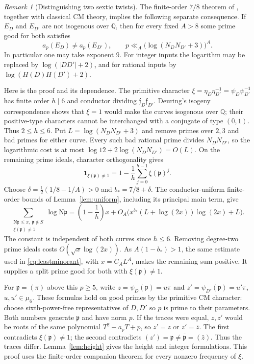 \documentclass[11pt,a4paper]{article}
\numberwithin{equation}{section}
\theoremstyle{definition}
\theoremstyle{remark}
\newtheorem{remark}[theorem]{Remark}
\newcommand{\Q}{\mathbb Q}
\newcommand{\N}{\mathrm N}
\newcommand{\ind}{\mathbf 1}
\begin{document}
\begin{remark}[Distinguishing two sextic twists]\label{rem:distinguish}
The finite-order $7/8$ theorem of \cite[Theorem 1.1]{QRH78}, together with classical CM theory, implies the following separate consequence. If $E_D$ and $E_{D'}$ are not isogenous over $\Q$, then for every fixed $A>8$ some prime good for both satisfies
\[
 a_p(E_D)\ne a_p(E_{D'}),\qquad
 p\ll_A\bigl(\log(N_DN_{D'}+3)\bigr)^A.
\]
In particular one may take exponent $9$. For integer inputs the logarithm may be replaced by $\log(|DD'|+2)$, and for rational inputs by $\log(H(D)H(D')+2)$.

Here is the proof and its dependence. The primitive character
$\xi=\eta_D\eta_{D'}^{-1}=\psi_D\psi_{D'}^{-1}$
has finite order $h\mid6$ and conductor dividing $\mathfrak f_D\mathfrak f_{D'}$.
Deuring's isogeny correspondence \cite[Theorem 4.5]{Zhang} shows that $\xi=1$ would make the curves isogenous over $\Q$; their positive-type characters cannot be interchanged with a conjugate of type $(0,1)$. Thus $2\le h\le6$.
Put $L=\log(N_DN_{D'}+3)$ and remove primes over $2,3$ and bad primes for either curve. Every such bad rational prime divides $N_DN_{D'}$, so the logarithmic cost is at most $\log12+2\log(N_DN_{D'})=O(L)$. On the remaining prime ideals, character orthogonality gives
\[
 \ind_{\xi(\mathfrak p)\ne1}
   =1-\frac1h\sum_{j=0}^{h-1}\xi(\mathfrak p)^j.
\]
Choose $\delta=\tfrac12(1/8-1/A)>0$ and $b_*=7/8+\delta$.
The conductor-uniform finite-order bounds of Lemma~\ref{lem:uniform}, including its principal main term, give
\[
 \sum_{\substack{\N\mathfrak p\le x,\ \mathfrak p\notin S\\
                    \xi(\mathfrak p)\ne1}}\log\N\mathfrak p
 =\left(1-\frac1h\right)x
  +O_A\bigl(x^{b_*}(L+\log(2x))\log(2x)+L\bigr).
\]
The constant is independent of both curves since $h\le6$.
Removing degree-two prime ideals costs $O(\sqrt x\log(2x))$.
As $A(1-b_*)>1$, the same estimate used in \eqref{eq:leastminorant}, with $x=C_A L^A$, makes the remaining sum positive. It supplies a split prime good for both with $\xi(\mathfrak p)\ne1$.

For $\mathfrak p=(\pi)$ above this $p\ge5$, write
$z=\psi_D(\mathfrak p)=u\pi$ and
$z'=\psi_{D'}(\mathfrak p)=u'\pi$, $u,u'\in\mu_6$.
These formulas hold on good primes by the primitive CM character: choose sixth-power-free representatives of $D,D'$ so $p$ is prime to their parameters. Both numbers generate $\mathfrak p$ and have norm $p$.
If the traces were equal, $z,z'$ would be roots of the same polynomial $T^2-a_pT+p$, so $z'=z$ or $z'=\bar z$. The first contradicts $\xi(\mathfrak p)\ne1$; the second contradicts $(z')=\mathfrak p\ne\overline{\mathfrak p}=(\bar z)$.
Thus the traces differ. Lemma~\ref{lem:height} gives the height and integer formulations.
This proof uses the finite-order companion theorem for every nonzero frequency of $\xi$.
\end{remark}
\end{document}
